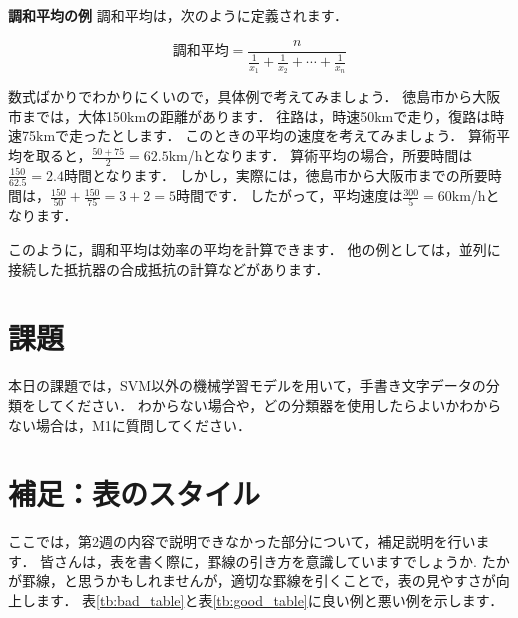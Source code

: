 \documentclass{jarticle}
\begin{document}
\begin{itembox}[l]{\textbf{調和平均の例}}
調和平均は，次のように定義されます．

\begin{equation}
  \text{調和平均} = \frac{n}{\frac{1}{x_1} + \frac{1}{x_2} + \cdots + \frac{1}{x_n}}
\end{equation}

数式ばかりでわかりにくいので，具体例で考えてみましょう．
徳島市から大阪市までは，大体150kmの距離があります．
往路は，時速50kmで走り，復路は時速75kmで走ったとします．
このときの平均の速度を考えてみましょう．
算術平均を取ると，$\frac{50 + 75}{2} = 62.5$km/hとなります．
算術平均の場合，所要時間は$\frac{150}{62.5} = 2.4$時間となります．
しかし，実際には，徳島市から大阪市までの所要時間は，$\frac{150}{50} + \frac{150}{75} = 3 + 2 = 5$時間です．
したがって，平均速度は$\frac{300}{5} = 60$km/hとなります．

このように，調和平均は効率の平均を計算できます．
他の例としては，並列に接続した抵抗器の合成抵抗の計算などがあります．
\end{itembox}

\section{課題}
本日の課題では，SVM以外の機械学習モデルを用いて，手書き文字データの分類をしてください．
わからない場合や，どの分類器を使用したらよいかわからない場合は，M1に質問してください．

\appendix
\section{補足：表のスタイル}
ここでは，第2週の内容で説明できなかった部分について，補足説明を行います．
皆さんは，表を書く際に，罫線の引き方を意識していますでしょうか.
たかが罫線，と思うかもしれませんが，適切な罫線を引くことで，表の見やすさが向上します．
表\ref{tb:bad_table}と表\ref{tb:good_table}に良い例と悪い例を示します．
\end{document}

